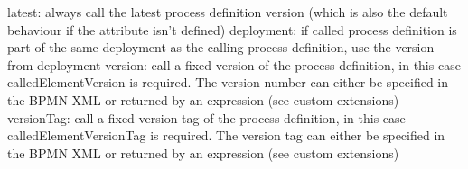     latest: always call the latest process definition version (which is also the default behaviour if the attribute isn’t defined)
    deployment: if called process definition is part of the same deployment as the calling process definition, use the version from deployment
    version: call a fixed version of the process definition, in this case calledElementVersion is required. The version number can either be specified in the BPMN XML or returned by an expression (see custom extensions)
    versionTag: call a fixed version tag of the process definition, in this case calledElementVersionTag is required. The version tag can either be specified in the BPMN XML or returned by an expression (see custom extensions)






